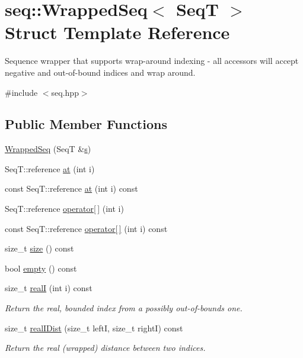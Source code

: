 \hypertarget{structseq_1_1_wrapped_seq}{\section{seq\-:\-:Wrapped\-Seq$<$ Seq\-T $>$ Struct Template Reference}
\label{structseq_1_1_wrapped_seq}
}


Sequence wrapper that supports wrap-\/around indexing -\/ all accessors will accept negative and out-\/of-\/bound indices and wrap around.  




{\ttfamily \#include $<$seq.\-hpp$>$}

\subsection*{Public Member Functions}
\begin{DoxyCompactItemize}
\item 
\hyperlink{structseq_1_1_wrapped_seq_aeb07ecb3ae54bc7460405d3f95098bcd}{Wrapped\-Seq} (Seq\-T \&\hyperlink{structseq_1_1_wrapped_seq_a838d548016ce08b745cb29dbee635437}{s})
\item 
Seq\-T\-::reference \hyperlink{structseq_1_1_wrapped_seq_a2267a0d93467dc4db6b64a9914a0e265}{at} (int i)
\item 
const Seq\-T\-::reference \hyperlink{structseq_1_1_wrapped_seq_a09864746e7dfb9e0d1ef6ebc59a9a4e8}{at} (int i) const 
\item 
Seq\-T\-::reference \hyperlink{structseq_1_1_wrapped_seq_a7ffd5783fc6d50fad65f89e6e2cc8489}{operator\mbox{[}$\,$\mbox{]}} (int i)
\item 
const Seq\-T\-::reference \hyperlink{structseq_1_1_wrapped_seq_a562c969d3a8f3c8aeede89d25747ba64}{operator\mbox{[}$\,$\mbox{]}} (int i) const 
\item 
size\-\_\-t \hyperlink{structseq_1_1_wrapped_seq_ab892f134a58400cc8a8ae32a2dabb7c4}{size} () const 
\item 
bool \hyperlink{structseq_1_1_wrapped_seq_abef397e7335e8705520777284326fe23}{empty} () const 
\item 
size\-\_\-t \hyperlink{structseq_1_1_wrapped_seq_a0259bb6a1a44a68e4dbda5b37750f503}{real\-I} (int i) const 
\begin{DoxyCompactList}\small\item\em Return the real, bounded index from a possibly out-\/of-\/bounds one. \end{DoxyCompactList}\item 
size\-\_\-t \hyperlink{structseq_1_1_wrapped_seq_a2b929ec2f56c92a9b2269f1853e4cd10}{real\-I\-Dist} (size\-\_\-t left\-I, size\-\_\-t right\-I) const 
\begin{DoxyCompactList}\small\item\em Return the real (wrapped) distance between two indices. \end{DoxyCompactList}\end{DoxyCompactItemize}
